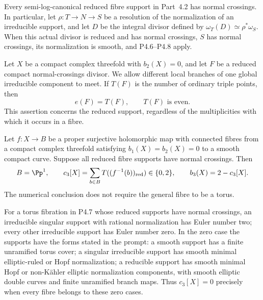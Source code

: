 \begin{proposition}[P4.25]\hypertarget{tag-02WX}{}\label{night:P4.25}\label{stmt:P4.25}


Every semi-log-canonical reduced fibre support in
Part~4.2 has normal crossings. In particular, let
$\rho:T\to N\to S$ be a resolution of the normalization
of an irreducible support, and let $D$ be the integral
divisor defined by
$\omega_T(D)\simeq\rho^*\omega_S$. When this actual
divisor is reduced and has normal crossings, $S$
has normal crossings, its normalization is smooth,
and P4.6--P4.8 apply.
\end{proposition}

\begin{proposition}[P4.6]\hypertarget{tag-02XY}{}\label{night:P4.6}\label{stmt:P4.6}


Let $X$ be a compact complex threefold with $b_2(X)=0$, and let $F$ be a
reduced compact normal-crossings divisor. We allow different local
branches of one global irreducible component to meet. If $T(F)$ is the
number of ordinary triple points, then
\[
 e(F)=T(F),\qquad T(F)\text{ is even}.
\]
This assertion concerns the reduced support, regardless of the
multiplicities with which it occurs in a fibre.
\end{proposition}

\begin{proposition}[P4.7]\hypertarget{tag-02XZ}{}\label{night:P4.7}\label{stmt:P4.7}


Let $f:X\to B$ be a proper surjective holomorphic map with connected
fibres from a compact complex threefold satisfying $b_1(X)=b_2(X)=0$
to a smooth compact curve. Suppose all reduced fibre supports have
normal crossings. Then
\[
 B=\Pp^1,\qquad
 c_3[X]=\sum_{b\in B}T((f^{-1}(b))_{\mathrm{red}})\in\{0,2\},\qquad
 b_3(X)=2-c_3[X].
\]
The numerical conclusion does not require the general fibre to be a
torus.
\end{proposition}

\begin{proposition}[P4.8]\hypertarget{tag-02Y0}{}\label{night:P4.8}\label{stmt:P4.8}


For a torus fibration in P4.7 whose reduced supports have normal
crossings, an irreducible singular support with
rational normalization has Euler number two; every other irreducible
support has Euler number zero. In the zero case the supports have the
forms stated in the prompt: a smooth support has a finite unramified
torus cover; a singular irreducible support has smooth minimal
elliptic-ruled or Hopf normalization; a reducible support has smooth
minimal Hopf or non-Kähler elliptic normalization components, with
smooth elliptic double curves and finite unramified branch maps.
Thus $c_3[X]=0$ precisely when every fibre belongs to these zero cases.
\end{proposition}

